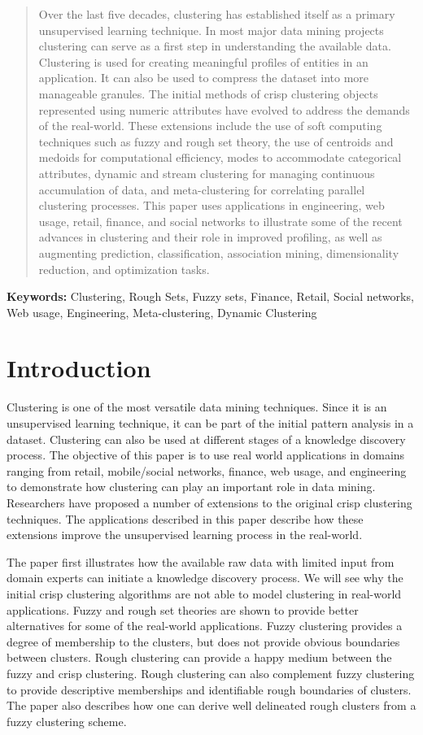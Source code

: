 \documentclass[oribibl]{llncs}
\providecommand{\keywords}[1]{\textbf{{Keywords:}} #1}
\begin{document}
\begin{abstract}
Over the last five decades, clustering has established itself as a primary unsupervised learning technique. In most major data mining projects clustering can serve as a first step in understanding the available data. Clustering is used for creating meaningful profiles of entities in an application. It can also be used to compress the dataset into more manageable granules. The initial methods of crisp clustering objects represented using numeric attributes have evolved to address the demands of the real-world. These extensions include the use of soft computing techniques such as fuzzy and rough set theory, the use of centroids and medoids for computational efficiency, modes to accommodate categorical attributes, dynamic and stream clustering for managing continuous accumulation of data, and meta-clustering for correlating parallel clustering processes. This paper uses applications in engineering, web usage, retail, finance, and social networks to illustrate some of the recent advances in clustering and their role in improved profiling, as well as augmenting prediction, classification, association mining, dimensionality reduction, and optimization tasks.
\end{abstract}



\keywords{
Clustering, Rough Sets, Fuzzy sets, Finance, Retail, Social networks, Web usage, Engineering, Meta-clustering, Dynamic Clustering
}

\section{Introduction}

Clustering is one of the most versatile data mining techniques. Since it is an unsupervised learning technique, it can be part of the initial pattern analysis in a dataset. Clustering can also be used at different stages of a knowledge discovery process. The objective of this paper is to use real world applications in domains ranging from retail, mobile/social networks, finance, web usage, and engineering to demonstrate how clustering can play an important role in data mining. Researchers have proposed a number of extensions to the original crisp clustering techniques. The applications described in this paper describe how these extensions improve the unsupervised learning process in the real-world.

The paper first illustrates how the available raw data with limited input from domain experts can initiate a knowledge discovery process. We will see why the initial  crisp clustering algorithms are not able to model clustering in real-world applications. Fuzzy and rough set theories are shown to provide better alternatives for some of the real-world applications. Fuzzy clustering provides a degree of membership to the clusters, but does not provide obvious boundaries between clusters. Rough clustering can provide a happy medium between the fuzzy and crisp clustering. Rough clustering can also complement fuzzy clustering to provide descriptive memberships and identifiable rough boundaries of clusters. The paper also describes how one can derive well delineated rough clusters from a fuzzy clustering scheme.
\end{document}
